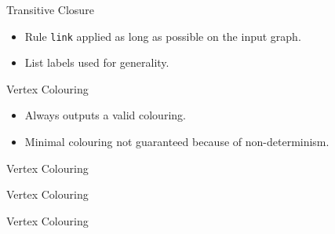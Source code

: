 \documentclass[14pt]{beamer}
\begin{document}
\begin{frame}{Transitive Closure}
\begin{center}

\end{center}
\begin{itemize}
\item Rule \texttt{link} applied as long as possible on the input graph.
\item List labels used for generality.
\end{itemize}
\end{frame}

\begin{frame}{Vertex Colouring}
\begin{center}

\end{center}
\begin{itemize}
\item Always outputs a valid colouring.
\item Minimal colouring not guaranteed because of non-determinism.
\end{itemize}
\end{frame}

\begin{frame}{Vertex Colouring}

\end{frame}

\begin{frame}{Vertex Colouring}

\end{frame}

\begin{frame}{Vertex Colouring}

\end{frame}


\end{document}
